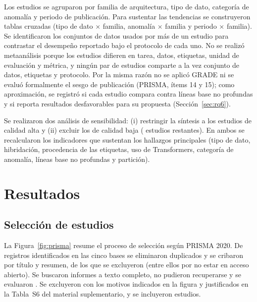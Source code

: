 \documentclass[12pt, a4paper]{article}
\begin{document}
Los estudios se agruparon por familia de arquitectura, tipo de dato, categoría de anomalía y periodo de publicación. Para sustentar las tendencias se construyeron tablas cruzadas (tipo de dato $\times$ familia, anomalía $\times$ familia y periodo $\times$ familia). Se identificaron los conjuntos de datos usados por más de un estudio para contrastar el desempeño reportado bajo el protocolo de cada uno. No se realizó metaanálisis porque los estudios difieren en tarea, datos, etiquetas, unidad de evaluación y métrica, y ningún par de estudios comparte a la vez conjunto de datos, etiquetas y protocolo. Por la misma razón no se aplicó GRADE ni se evaluó formalmente el sesgo de publicación (PRISMA, ítems 14 y 15); como aproximación, se registró si cada estudio compara contra líneas base no profundas y si reporta resultados desfavorables para su propuesta (Sección~\ref{sec:rq6}).

Se realizaron dos análisis de sensibilidad: (i) restringir la síntesis a los \NaltaCalidad{} estudios de calidad alta y (ii) excluir los \NbajaCalidad{} de calidad baja (\NsinBaja{} estudios restantes). En ambos se recalcularon los indicadores que sustentan los hallazgos principales (tipo de dato, hibridación, procedencia de las etiquetas, uso de Transformers, categoría de anomalía, líneas base no profundas y partición).

\section{Resultados}
\label{sec:resultados}

\subsection{Selección de estudios}

La Figura~\ref{fig:prisma} resume el proceso de selección según PRISMA 2020. De \Pidentificados{} registros identificados en las cinco bases se eliminaron \Pduplicados{} duplicados y se cribaron \Pcribados{} por título y resumen, de los que se excluyeron \PexclTA{} (entre ellos \NexclOA{} por no estar en acceso abierto). Se buscaron \Pbuscados{} informes a texto completo, \PnoRecuperados{} no pudieron recuperarse y se evaluaron \Pevaluados. Se excluyeron \PexclTC{} con los motivos indicados en la figura y justificados en la Tabla~S6 del material suplementario, y se incluyeron \Nestudios{} estudios.
\end{document}
